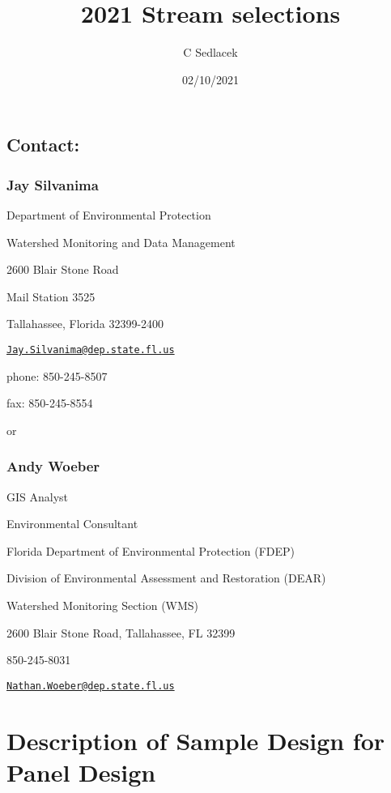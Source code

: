 \documentclass[
]{article}
\title{2021 Stream selections}
\author{C Sedlacek}
\date{02/10/2021}
\begin{document}
\maketitle

\hypertarget{contact}{%
\subsection{Contact:}\label{contact}}

\hypertarget{jay-silvanima}{%
\subsubsection{Jay Silvanima}\label{jay-silvanima}}

Department of Environmental Protection

Watershed Monitoring and Data Management

2600 Blair Stone Road

Mail Station 3525

Tallahassee, Florida 32399-2400

\href{mailto:Jay.Silvanima@dep.state.fl.us}{\nolinkurl{Jay.Silvanima@dep.state.fl.us}}

phone: 850-245-8507

fax: 850-245-8554

or

\hypertarget{andy-woeber}{%
\subsubsection{Andy Woeber}\label{andy-woeber}}

GIS Analyst

Environmental Consultant

Florida Department of Environmental Protection (FDEP)

Division of Environmental Assessment and Restoration (DEAR)

Watershed Monitoring Section (WMS)

2600 Blair Stone Road, Tallahassee, FL 32399

850-245-8031

\href{mailto:Nathan.Woeber@dep.state.fl.us}{\nolinkurl{Nathan.Woeber@dep.state.fl.us}}

\hypertarget{description-of-sample-design-for-panel-design}{%
\section{\texorpdfstring{\textbf{Description of Sample Design for Panel
Design}}{Description of Sample Design for Panel Design}}\label{description-of-sample-design-for-panel-design}}
\end{document}
